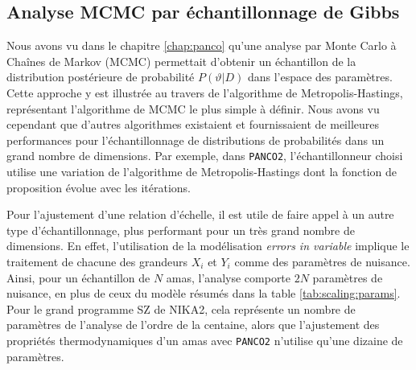 \subsection{Analyse MCMC par échantillonnage de Gibbs}

Nous avons vu dans le chapitre \ref{chap:panco} qu'une analyse par Monte Carlo à Chaînes de Markov (MCMC) permettait d'obtenir un échantillon de la distribution postérieure de probabilité $P(\vartheta | D)$ dans l'espace des paramètres.
Cette approche y est illustrée au travers de l'algorithme de Metropolis-Hastings, représentant l'algorithme de MCMC le plus simple à définir.
Nous avons vu cependant que d'autres algorithmes existaient et fournissaient de meilleures performances pour l'échantillonnage de distributions de probabilités dans un grand nombre de dimensions.
Par exemple, dans \texttt{PANCO2}, l'échantillonneur choisi utilise une variation de l'algorithme de Metropolis-Hastings dont la fonction de proposition évolue avec les itérations.

Pour l'ajustement d'une relation d'échelle, il est utile de faire appel à un autre type d'échantillonnage, plus performant pour un très grand nombre de dimensions.
En effet, l'utilisation de la modélisation \textit{errors in variable} implique le traitement de chacune des grandeurs $X_i$ et $Y_i$ comme des paramètres de nuisance.
Ainsi, pour un échantillon de $N$ amas, l'analyse comporte $2N$ paramètres de nuisance, en plus de ceux du modèle résumés dans la table \ref{tab:scaling:params}.
Pour le grand programme SZ de NIKA2, cela représente un nombre de paramètres de l'analyse de l'ordre de la centaine, alors que l'ajustement des propriétés thermodynamiques d'un amas avec \texttt{PANCO2} n'utilise qu'une dizaine de paramètres.

